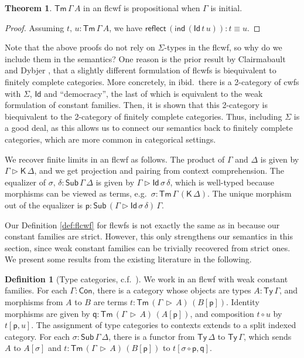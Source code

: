 \documentclass[12pt,a4paper,twoside,openany]{book}
\theoremstyle{remark}
\theoremstyle{definition}
\newtheorem{mydefinition}{Definition}
\theoremstyle{theorem}
\newtheorem{theorem}{Theorem}
\newcommand{\ms}[1]{\mathsf{#1}}
\newcommand{\reflect}{\mathsf{reflect}}
\newcommand{\Con}{\mathsf{Con}}
\newcommand{\Sub}{\mathsf{Sub}}
\newcommand{\Tm}{\mathsf{Tm}}
\newcommand{\Ty}{\mathsf{Ty}}
\newcommand{\Id}{\mathsf{Id}}
\newcommand{\ext}{\triangleright}
\newcommand{\p}{\mathsf{p}}
\newcommand{\q}{\mathsf{q}}
\newcommand{\K}{\mathsf{K}}
\begin{document}
\begin{theorem}
\label{thm:flcwf-term-uniqueness}
$\Tm\,\Gamma\,A$ in an flcwf is propositional when $\Gamma$ is initial.
\end{theorem}
\begin{proof} Assuming $t,\,u : \Tm\,\Gamma\,A$, we have
$\reflect\,(\ms{ind}\,(\Id\,t\,u)) : t \equiv u$.
\end{proof}

Note that the above proofs do not rely on $\Sigma$-types in the flcwf, so why do
we include them in the semantics? One reason is the prior result by Clairmabault
and Dybjer \cite{clairambault2014biequivalence}, that a slightly different
formulation of flcwfs is biequivalent to finitely complete categories. More
concretely, in ibid.\ there is a 2-category of cwfs with $\Sigma$, $\Id$ and
``democracy'', the last of which is equivalent to the weak formulation of
constant families. Then, it is shown that this 2-category is biequivalent to the
2-category of finitely complete categories. Thus, including $\Sigma$ is a good
deal, as this allows us to connect our semantics back to finitely complete
categories, which are more common in categorical settings.

We recover finite limits in an flcwf as follows. The product of $\Gamma$ and
$\Delta$ is given by $\Gamma \ext \K\,\Delta$, and we get projection and pairing
from context comprehension. The equalizer of $\sigma,\,\delta :
\Sub\,\Gamma\,\Delta$ is given by $\Gamma \ext \Id\,\sigma\,\delta$, which is
well-typed because morphisms can be viewed as terms, e.g.\ $\sigma :
\Tm\,\Gamma\,(\K\,\Delta)$. The unique morphism out of the equalizer is $\p :
\Sub\,(\Gamma \ext \Id\,\sigma\,\delta)\,\Gamma$.

Our Definition \ref{def:flcwf} for flcwfs is not exactly the same as in
\cite{clairambault2014biequivalence} because our constant families are
strict. However, this only strengthens our semantics in this section, since weak
constant families can be trivially recovered from strict ones. We present some
results from the existing literature in the following.

\begin{mydefinition}[Type categories, c.f.\ {\cite[Section 2.2]{clairambault2014biequivalence}}]
\label{def:type_categories}
We work in an flcwf with weak constant families. For each $\Gamma : \Con$, there
is a category whose objects are types $A : \Ty\,\Gamma$, and morphisms from $A$
to $B$ are terms $t : \Tm\,(\Gamma\,\ext\,A)\,(B[\p])$. Identity morphisms are
given by $\q : \Tm\,(\Gamma\,\ext\,A)\,(A[\p])$, and composition $t \circ u$ by
$t[\p, u]$. The assignment of type categories to contexts extends to a split
indexed category. For each $\sigma : \Sub\,\Gamma\,\Delta$, there is a functor
from $\Ty\,\Delta$ to $\Ty\,\Gamma$, which sends $A$ to $A[\sigma]$ and $t :
\Tm\,(\Gamma\,\ext\,A)\,(B[\p])$ to $t[\sigma\circ \p, \q]$.
\end{mydefinition}
\end{document}
